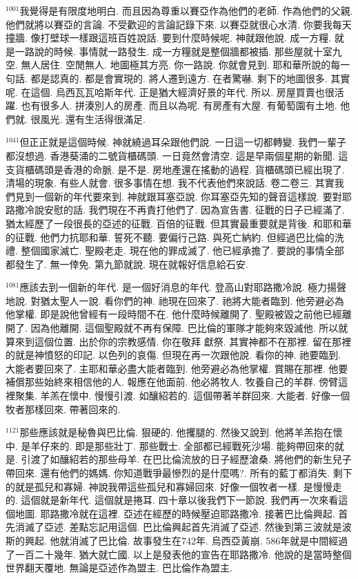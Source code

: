 \documentclass{book}
\begin{document}
$^{1001}$我覺得是有限度地明白.
而且因為尊重以賽亞作為他們的老師.
作為他們的父親.
他們就將以賽亞的言論.
不受歡迎的言論記錄下來.
以賽亞就很心水清.
你要我每天撞牆.
像打壁球一樣跟這班百姓說話.
要到什麼時候呢.
神就跟他說.
成一方糧.
就是一路說的時候.
事情就一路發生.
成一方糧就是整個牆都被插.
那些屋就十室九空.
無人居住.
空閒無人.
地圖極其方亮.
你一路說.
你就會見到.
耶和華所說的每一句話.
都是認真的.
都是會實現的.
將人遷到遠方.
在者驚嚇.
剩下的地圖很多.
其實呢.
在這個.
烏西瓦瓦哈斯年代.
正是猶大經濟好景的年代.
所以.
房屋買賣也很活躍.
也有很多人.
拼湊別人的房產.
而且以為呢.
有房產有大屋.
有葡萄園有土地.
他們就.
很風光.
還有生活得很滿足.

$^{1041}$但正正就是這個時候.
神就繞過耳朵跟他們說.
一日這一切都轉變.
我們一輩子都沒想過.
香港葵涌的二號貨櫃碼頭.
一日竟然會清空.
這是早兩個星期的新聞.
這支貨櫃碼頭是香港的命脈.
是不是.
房地產還在搖動的過程.
貨櫃碼頭已經出現了.
清場的現象.
有些人就會.
很多事情在想.
我不代表他們來說話.
卷二卷三.
其實我們見到一個新的年代要來到.
神就跟耳塞亞說.
你耳塞亞先知的聲音這樣說.
要對耶路撒冷說安慰的話.
我們現在不再責打他們了.
因為宣告書.
征戰的日子已經滿了.
猶太經歷了一段很長的亞述的征戰.
百倍的征戰.
但其實最重要就是背後.
和耶和華的征戰.
他們力抗耶和華.
誓死不聽.
要偏行己路.
與死亡納約.
但經過巴比倫的洗禮.
整個國家滅亡.
聖殿老走.
現在他的罪成滅了.
他已經承擔了.
要說的事情全部都發生了.
無一倖免.
第九節就說.
現在就報好信息給石安.

$^{1081}$應該去到一個新的年代.
是一個好消息的年代.
登高山對耶路撒冷說.
極力揚聲地說.
對猶太聖人一說.
看你們的神.
祂現在回來了.
祂將大能者臨到.
他旁避必為他掌權.
即是說他曾經有一段時間不在.
他什麼時候離開了.
聖殿被毀之前他已經離開了.
因為他離開.
這個聖殿就不再有保障.
巴比倫的軍隊才能夠來毀滅他.
所以就算來到這個位置.
出於你的宗教感情.
你在敬拜 獻祭.
其實神都不在那裡.
留在那裡的就是神憤怒的印記.
以色列的哀傷.
但現在再一次跟他說.
看你的神.
祂要臨到.
大能者要回來了.
主耶和華必盡大能者臨到.
他旁避必為他掌權.
賞賜在那裡.
他要補償那些始終來相信他的人.
報應在他面前.
他必將牧人.
牧養自己的羊群.
傍臂這裡聚集.
羊羔在懷中.
慢慢引渡.
如釀紹若的.
這個帶著羊群回來.
大能者.
好像一個牧者那樣回來.
帶著回來的.

$^{1121}$那些應該就是秘魯與巴比倫.
狠硬的.
他攫腿的.
然後又說到.
他將羊羔抱在懷中.
是羊仔來的.
即是那些壯丁.
那些戰士.
全部都已經戰死沙場.
能夠帶回來的就是.
引渡了如釀紹若的那些母羊.
在巴比倫流放的日子經歷滄桑.
將他們的新生兒子帶回來.
還有他們的媽媽.
你知道戰爭最慘烈的是什麼嗎?.
所有的藍丁都消失.
剩下的就是孤兒和寡婦.
神說我帶這些孤兒和寡婦回來.
好像一個牧者一樣.
是慢慢走的.
這個就是新年代.
這個就是捲耳.
四十章以後我們下一節說.
我們再一次來看這個地圖.
耶路撒冷就在這裡.
亞述在經歷的時候壓迫耶路撒冷.
接著巴比倫興起.
首先消滅了亞述.
差點忘記用這個.
巴比倫興起首先消滅了亞述.
然後到第三波就是波斯的興起.
他就消滅了巴比倫.
故事發生在742年.
烏西亞黃崩.
586年就是中間經過了一百二十幾年.
猶大就亡國.
以上是發表他的宣告在耶路撒冷.
他說的是當時整個世界翻天覆地.
無論是亞述作為盟主.
巴比倫作為盟主.
\end{document}
